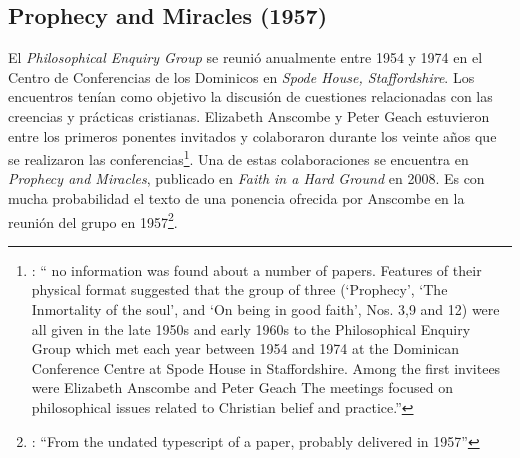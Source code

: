 \subsection{Prophecy and Miracles (1957)}
\label{subsec:prophnmi}

El \emph{Philosophical Enquiry Group} se reunió anualmente entre 1954 y 1974 en el Centro de Conferencias de los Dominicos en \emph{Spode House, Staffordshire}. Los encuentros tenían como objetivo la discusión de cuestiones relacionadas con las creencias y prácticas cristianas. Elizabeth Anscombe y Peter Geach estuvieron entre los primeros ponentes invitados y colaboraron durante los veinte años que se realizaron las conferencias\footnote{\cite[Cf.~][x]{anscombe2008faith}: \enquote{\textelp{} no information was found about a number of papers. Features of their physical format suggested that the group of three (`Prophecy', `The Inmortality of the soul', and `On being in good faith', Nos. 3,9 and 12) were all given in the late 1950s and early 1960s to the Philosophical Enquiry Group which met each year between 1954 and 1974 at the Dominican Conference Centre at Spode House in Staffordshire. \textelp{} Among the first invitees were Elizabeth Anscombe and Peter Geach \textelp{} The meetings focused on philosophical issues related to Christian belief and practice.}}. Una de estas colaboraciones se encuentra en \emph{Prophecy and Miracles}, publicado en \emph{Faith in a Hard Ground} en 2008. Es con mucha probabilidad el texto de una ponencia ofrecida por Anscombe en la reunión del grupo en 1957\footnote{\cite[Cf.~][nota a pie de página 20]{anscombe2008faith:prophandmi}: \enquote{From the undated typescript of a paper, probably delivered in 1957}}.

